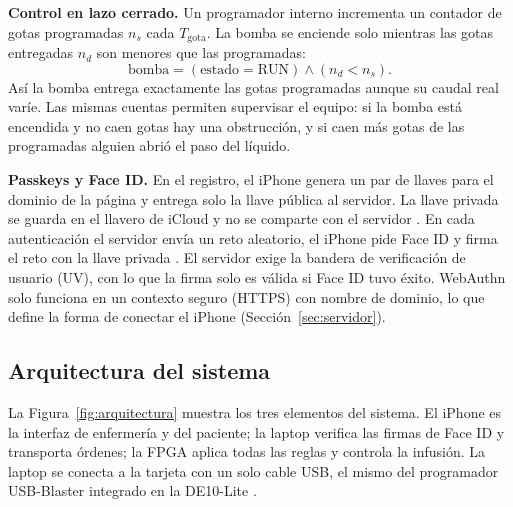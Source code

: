 \documentclass[11pt,letterpaper]{article}
\begin{document}
\textbf{Control en lazo cerrado.} Un programador interno incrementa un contador de gotas programadas $n_s$ cada $T_{\text{gota}}$. La bomba se enciende solo mientras las gotas entregadas $n_d$ son menores que las programadas:
\begin{equation}
\text{bomba} = (\text{estado} = \text{RUN}) \land (n_d < n_s).
\label{eq:bomba}
\end{equation}
Así la bomba entrega exactamente las gotas programadas aunque su caudal real varíe. Las mismas cuentas permiten supervisar el equipo: si la bomba está encendida y no caen gotas hay una obstrucción, y si caen más gotas de las programadas alguien abrió el paso del líquido.

\textbf{Passkeys y Face ID.} En el registro, el iPhone genera un par de llaves para el dominio de la página y entrega solo la llave pública al servidor. La llave privada se guarda en el llavero de iCloud y no se comparte con el servidor \cite{apple_passkeys}. En cada autenticación el servidor envía un reto aleatorio, el iPhone pide Face ID y firma el reto con la llave privada \cite{webauthn,apple_biometric}. El servidor exige la bandera de verificación de usuario (UV), con lo que la firma solo es válida si Face ID tuvo éxito. WebAuthn solo funciona en un contexto seguro (HTTPS) con nombre de dominio, lo que define la forma de conectar el iPhone (Sección~\ref{sec:servidor}).

\subsection{Arquitectura del sistema}
La Figura~\ref{fig:arquitectura} muestra los tres elementos del sistema. El iPhone es la interfaz de enfermería y del paciente; la laptop verifica las firmas de Face ID y transporta órdenes; la FPGA aplica todas las reglas y controla la infusión. La laptop se conecta a la tarjeta con un solo cable USB, el mismo del programador USB-Blaster integrado en la DE10-Lite \cite{de10lite}.
\end{document}
